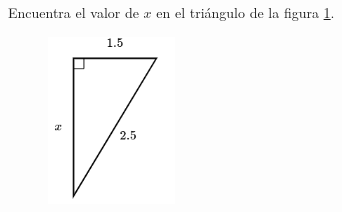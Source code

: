 \question[15]  Encuentra el valor de $x$ en el triángulo de la figura \ref{fig:lados_pitagoras_30}.
\begin{figure}[H]
    \begin{center}
        \includegraphics[width=0.3\textwidth]{../images/lados_pitagoras_30.png}
    \end{center}
    \caption{}
    \label{fig:lados_pitagoras_30}
\end{figure}